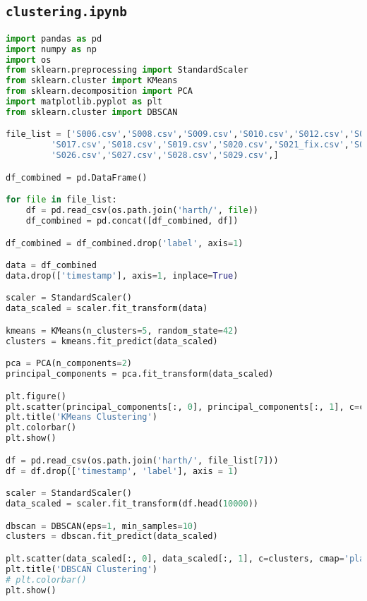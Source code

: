     \subsection{\texttt{clustering.ipynb}}
\begin{lstlisting}[language=Python]
import pandas as pd
import numpy as np
import os
from sklearn.preprocessing import StandardScaler
from sklearn.cluster import KMeans
from sklearn.decomposition import PCA
import matplotlib.pyplot as plt
from sklearn.cluster import DBSCAN

file_list = ['S006.csv','S008.csv','S009.csv','S010.csv','S012.csv','S013.csv','S014.csv','S015_fix.csv','S016.csv',
         'S017.csv','S018.csv','S019.csv','S020.csv','S021_fix.csv','S022.csv','S023_fix.csv','S024.csv','S025.csv',
         'S026.csv','S027.csv','S028.csv','S029.csv',]

df_combined = pd.DataFrame()

for file in file_list:
    df = pd.read_csv(os.path.join('harth/', file))
    df_combined = pd.concat([df_combined, df])

df_combined = df_combined.drop('label', axis=1)

data = df_combined
data.drop(['timestamp'], axis=1, inplace=True)

scaler = StandardScaler()
data_scaled = scaler.fit_transform(data)

kmeans = KMeans(n_clusters=5, random_state=42)
clusters = kmeans.fit_predict(data_scaled)

pca = PCA(n_components=2)
principal_components = pca.fit_transform(data_scaled)

plt.figure()
plt.scatter(principal_components[:, 0], principal_components[:, 1], c=clusters, cmap='plasma', alpha=0.5)
plt.title('KMeans Clustering')
plt.colorbar()
plt.show()

df = pd.read_csv(os.path.join('harth/', file_list[7]))
df = df.drop(['timestamp', 'label'], axis = 1)

scaler = StandardScaler()
data_scaled = scaler.fit_transform(df.head(10000))

dbscan = DBSCAN(eps=1, min_samples=10)
clusters = dbscan.fit_predict(data_scaled)

plt.scatter(data_scaled[:, 0], data_scaled[:, 1], c=clusters, cmap='plasma', alpha=0.5)
plt.title('DBSCAN Clustering')
# plt.colorbar()
plt.show()
\end{lstlisting}